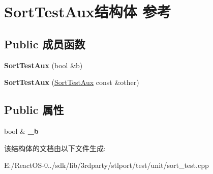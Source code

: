 \hypertarget{struct_sort_test_aux}{}\section{Sort\+Test\+Aux结构体 参考}
\label{struct_sort_test_aux}
\subsection*{Public 成员函数}
\begin{DoxyCompactItemize}
\item 
\mbox{\label{struct_sort_test_aux_ad38ec3b4a3ef0d89b8af046b1ada50a7}} 
{\bfseries Sort\+Test\+Aux} (bool \&b)
\item 
\mbox{\label{struct_sort_test_aux_a83f82322c96a69bb731b84d7037d0cdd}} 
{\bfseries Sort\+Test\+Aux} (\hyperlink{struct_sort_test_aux}{Sort\+Test\+Aux} const \&other)
\end{DoxyCompactItemize}
\subsection*{Public 属性}
\begin{DoxyCompactItemize}
\item 
\mbox{\label{struct_sort_test_aux_aeeed741f12cc7e84db64441dafbcf945}} 
bool \& {\bfseries \+\_\+b}
\end{DoxyCompactItemize}


该结构体的文档由以下文件生成\+:\begin{DoxyCompactItemize}
\item 
E\+:/\+React\+O\+S-\/0../sdk/lib/3rdparty/stlport/test/unit/sort\+\_\+test.\+cpp\end{DoxyCompactItemize}
